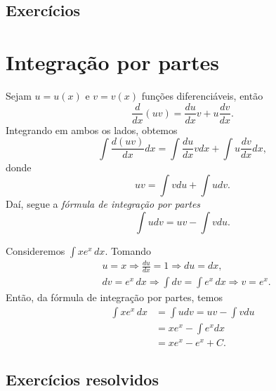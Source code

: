\emconstrucao

\subsection*{Exercícios}

\emconstrucao

\section{Integração por partes}\label{cap_int_sec_partes}

Sejam $u=u(x)$ e $v=v(x)$ funções diferenciáveis, então
\begin{equation}
  \frac{d}{dx}(uv) = \frac{du}{dx}v + u\frac{dv}{dx}.
\end{equation}
Integrando em ambos os lados, obtemos
\begin{equation}
  \int \frac{d (uv)}{dx}dx = \int \frac{du}{dx}vdx + \int u\frac{dv}{dx}dx,
\end{equation}
donde
\begin{equation}
  uv = \int vdu + \int udv.
\end{equation}
Daí, segue a \emph{fórmula de integração por partes}
\begin{equation}
  \int udv = uv - \int vdu.
\end{equation}

\begin{ex}
  Consideremos $\int xe^x\,dx$. Tomando
  \begin{align}
    &u = x \Rightarrow \frac{du}{dx} = 1 \Rightarrow du = dx,\\
    &dv = e^x\,dx \Rightarrow \int dv = \int e^x\,dx \Rightarrow v = e^x.
  \end{align}
  Então, da fórmula de integração por partes, temos
  \begin{align}
    \int xe^x\,dx &= \int udv = uv - \int vdu\\
                  &= xe^x - \int e^xdx\\
                  &= xe^x - e^x + C.
  \end{align}
\end{ex}

\subsection*{Exercícios resolvidos}

